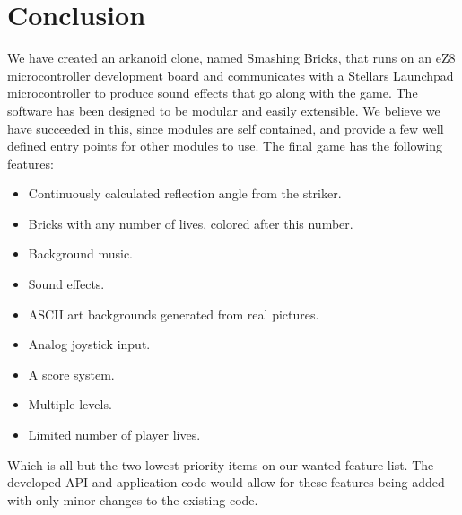\section{Conclusion}
We have created an arkanoid clone, named Smashing Bricks, that runs on an eZ8 microcontroller
 development board and communicates with a Stellars Launchpad microcontroller to produce sound effects
that go along with the game. The software has been designed to be modular and
easily extensible. We believe we have succeeded in this, since modules are self contained, 
and provide a few well defined entry points for other modules to use. The final game has
the following features:
\begin{itemize}
	\item Continuously calculated reflection angle from the striker.
	\item Bricks with any number of lives, colored after this number.
	\item Background music.
	\item Sound effects.
	\item ASCII art backgrounds generated from real pictures.
	\item Analog joystick input.
	\item A score system.
	\item Multiple levels.
	\item Limited number of player lives.
\end{itemize}
Which is all but the two lowest priority items on our wanted feature list. The developed API and application code
would allow for these features being added with only minor changes to the existing code.
